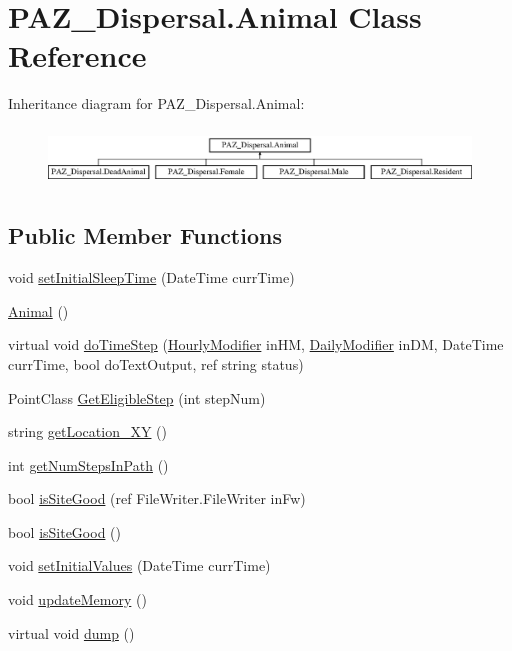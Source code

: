 \hypertarget{class_p_a_z___dispersal_1_1_animal}{\section{P\-A\-Z\-\_\-\-Dispersal.\-Animal Class Reference}
\label{class_p_a_z___dispersal_1_1_animal}
}
Inheritance diagram for P\-A\-Z\-\_\-\-Dispersal.\-Animal\-:\begin{figure}[H]
\begin{center}
\leavevmode
\includegraphics[height=1.573034cm]{class_p_a_z___dispersal_1_1_animal}
\end{center}
\end{figure}
\subsection*{Public Member Functions}
\begin{DoxyCompactItemize}
\item 
void \hyperlink{class_p_a_z___dispersal_1_1_animal_a707202c67d92e518ac1c0d1d9450db59}{set\-Initial\-Sleep\-Time} (Date\-Time curr\-Time)
\item 
\hyperlink{class_p_a_z___dispersal_1_1_animal_a094cd789663017f68a37d2d209de578b}{Animal} ()
\item 
virtual void \hyperlink{class_p_a_z___dispersal_1_1_animal_aa022ce4eb091f08c8154a4a1f2423aa0}{do\-Time\-Step} (\hyperlink{class_p_a_z___dispersal_1_1_hourly_modifier}{Hourly\-Modifier} in\-H\-M, \hyperlink{class_p_a_z___dispersal_1_1_daily_modifier}{Daily\-Modifier} in\-D\-M, Date\-Time curr\-Time, bool do\-Text\-Output, ref string status)
\item 
Point\-Class \hyperlink{class_p_a_z___dispersal_1_1_animal_a95b617e87a9e787a05f5b6af25fad85d}{Get\-Eligible\-Step} (int step\-Num)
\item 
string \hyperlink{class_p_a_z___dispersal_1_1_animal_a139ceed1c0bcb8512b59c1be24034aae}{get\-Location\-\_\-\-X\-Y} ()
\item 
int \hyperlink{class_p_a_z___dispersal_1_1_animal_a71ce20106583f35521a001bca15ba1bc}{get\-Num\-Steps\-In\-Path} ()
\item 
bool \hyperlink{class_p_a_z___dispersal_1_1_animal_ac7d09fe4d61f49a3707243d0cf6cc592}{is\-Site\-Good} (ref File\-Writer.\-File\-Writer in\-Fw)
\item 
bool \hyperlink{class_p_a_z___dispersal_1_1_animal_af616b2557381a6d7917b9866b2659cff}{is\-Site\-Good} ()
\item 
void \hyperlink{class_p_a_z___dispersal_1_1_animal_a11db86519e37cf7820ce9fdc8f1cfe88}{set\-Initial\-Values} (Date\-Time curr\-Time)
\item 
void \hyperlink{class_p_a_z___dispersal_1_1_animal_ad9e58b8a05bf842e23e1a339d9b0f0bd}{update\-Memory} ()
\item 
virtual void \hyperlink{class_p_a_z___dispersal_1_1_animal_ad31c349db36a13a4936380004e441ce4}{dump} ()
\end{DoxyCompactItemize}
